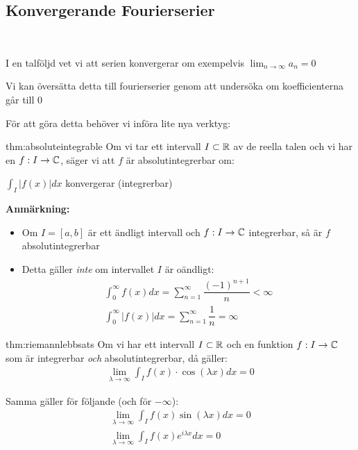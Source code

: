 \subsection{Konvergerande Fourierserier}\hfill\\\par
\noindent I en talföljd vet vi att serien konvergerar om exempelvis $\lim_{n\to\infty}a_n = 0$
\par\bigskip
\noindent Vi kan översätta detta till fourierserier genom att undersöka om koefficienterna går till 0 
\par\bigskip
\noindent För att göra detta behöver vi införa lite nya verktyg:
\par\bigskip
\begin{theo}[Absolutintegrerbar]{thm:absoluteintegrable}
  Om vi tar ett intervall $I\subset \mathbb{R}$ av de reella talen och vi har en $f:I\to\mathbb{C}$, säger vi att $f$ är absolutintegrerbar om:\par
  $\int_I |f(x)|dx$ konvergerar (integrerbar)\par
\end{theo}
\par\bigskip
\noindent\textbf{Anmärkning:}\par
\begin{itemize}
  \item Om $I = [a,b]$ är ett ändligt intervall och $f:I\to\mathbb{C}$ integrerbar, så är $f$ absolutintegrerbar\par
  \item Detta gäller \textit{inte} om intervallet $I$ är oändligt:
    \begin{equation*}
      \begin{gathered}
        \int_{0}^{\infty}f(x)dx = \sum_{n=1}^{\infty}\dfrac{(-1)^{n+1}}{n}<\infty\\
        \int_{0}^{\infty}\left|f(x)\right|dx = \sum_{n=1}^{\infty}\dfrac{1}{n} = \infty
      \end{gathered}
    \end{equation*}
\end{itemize}
\par\bigskip
\begin{theo}{thm:riemannlebbsats}
  Om vi har ett intervall $I\subset \mathbb{R}$ och en funktion $f:I\to\mathbb{C}$ som är integrerbar \textit{och} absolutintegrerbar, då gäller:
  \begin{equation*}
    \begin{gathered}
      \lim_{\lambda\to\infty}\int_{I}f(x)\cdot\cos(\lambda x)dx = 0
    \end{gathered}
  \end{equation*}
  \par\bigskip
  \noindent Samma gäller för följande (och för $-\infty$):
  \begin{equation*}
    \begin{gathered}
      \lim_{\lambda\to\infty}\int_{I}f(x)\sin(\lambda x)dx = 0\\
      \lim_{\lambda\to\infty}\int_{I}f(x)e^{i\lambda x}dx = 0
    \end{gathered}
  \end{equation*}
\end{theo}
